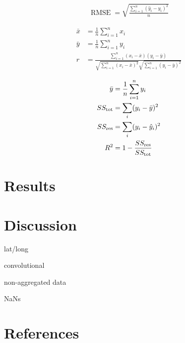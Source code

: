 \documentclass[letterpaper]{article}
\begin{document}
\begin{align*}
\operatorname{RMSE} = \sqrt{\frac{\sum_{i=1}^n (\hat y_i - y_i)^2}{n}}
\end{align*}

\begin{align*}
\bar{x} &= \frac{1}{n}\sum_{i=1}^n x_i \\
\bar{y} &= \frac{1}{n}\sum_{i=1}^n y_i \\
r &= \frac{\sum ^n _{i=1}(x_i - \bar{x})(y_i - \bar{y})}{\sqrt{\sum ^n _{i=1}(x_i - \bar{x})^2} \sqrt{\sum ^n _{i=1}(y_i - \bar{y})^2}}
\end{align*}

\begin{align*}
\bar{y} &= \frac{1}{n}\sum_{i=1}^n y_i \\
SS_\text{tot} &= \sum_i (y_i-\bar{y})^2 \\
SS_\text{res} &= \sum_i (y_i - \hat y_i)^2 \\
R^2 &= 1 - \frac{SS_{\rm res}}{SS_{\rm tot}}
\end{align*}

\section{Results}

\section{Discussion}

lat/long

convolutional

non-aggregated data

NaNs

\section{References}
\end{document}

